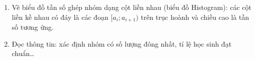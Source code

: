 \begin{enumerate}
\item Vẽ biểu đồ tần số ghép nhóm dạng cột liền nhau (biểu đồ Histogram): các cột liền kề nhau có đáy là các đoạn $[a_i; a_{i+1})$ trên trục hoành và chiều cao là tần số tương ứng.
\item Đọc thông tin: xác định nhóm có số lượng đông nhất, tỉ lệ học sinh đạt chuẩn\dots
\end{enumerate}
